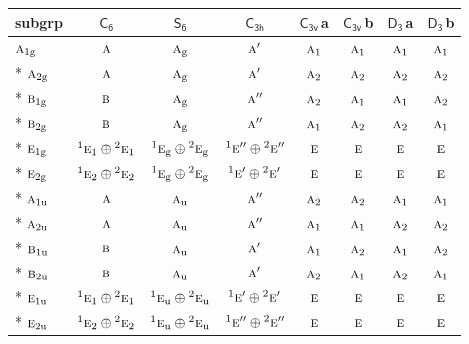 \documentclass[10pt,a4paper]{article}
\numberwithin{equation}{section}
\newcommand{\grp}[1]{\mathsf{#1}}
\newcommand{\irr}[1]{\text{\normalfont\scshape #1}}
\newcommand{\conjpair}[1]{{}^{#1}}
\newcommand{\ptag}[1]{\mathrm{#1}}
\newcommand{\clsletter}[1]{\,{\scriptsize\color{black!55}#1}}
\begin{document}
{\small\begin{longtable}{@{}lccccccc@{}}\toprule
subgrp & \href{C6.pdf}{$\grp{C_{6}}$} & \href{S6.pdf}{$\grp{S_{6}}$} & \href{C3h.pdf}{$\grp{C_{3h}}$} & \href{C3v.pdf}{$\grp{C_{3v}}$}\clsletter{a} & \href{C3v.pdf}{$\grp{C_{3v}}$}\clsletter{b} & \href{D3.pdf}{$\grp{D_{3}}$}\clsletter{a} & \href{D3.pdf}{$\grp{D_{3}}$}\clsletter{b}\\\midrule\endhead
\bottomrule\endfoot\endlastfoot
$\irr{a}_{1\ptag{g}}$ & $\irr{a}$ & $\irr{a}_{\ptag{g}}$ & $\irr{a}'$ & $\irr{a}_{1}$ & $\irr{a}_{1}$ & $\irr{a}_{1}$ & $\irr{a}_{1}$\\*
$\irr{a}_{2\ptag{g}}$ & $\irr{a}$ & $\irr{a}_{\ptag{g}}$ & $\irr{a}'$ & $\irr{a}_{2}$ & $\irr{a}_{2}$ & $\irr{a}_{2}$ & $\irr{a}_{2}$\\*
$\irr{b}_{1\ptag{g}}$ & $\irr{b}$ & $\irr{a}_{\ptag{g}}$ & $\irr{a}''$ & $\irr{a}_{2}$ & $\irr{a}_{1}$ & $\irr{a}_{1}$ & $\irr{a}_{2}$\\*
$\irr{b}_{2\ptag{g}}$ & $\irr{b}$ & $\irr{a}_{\ptag{g}}$ & $\irr{a}''$ & $\irr{a}_{1}$ & $\irr{a}_{2}$ & $\irr{a}_{2}$ & $\irr{a}_{1}$\\*
$\irr{e}_{1\ptag{g}}$ & $\conjpair{1}\irr{e}_{1}\oplus \conjpair{2}\irr{e}_{1}$ & $\conjpair{1}\irr{e}_{\ptag{g}}\oplus \conjpair{2}\irr{e}_{\ptag{g}}$ & $\conjpair{1}\irr{e}''\oplus \conjpair{2}\irr{e}''$ & $\irr{e}$ & $\irr{e}$ & $\irr{e}$ & $\irr{e}$\\*
$\irr{e}_{2\ptag{g}}$ & $\conjpair{1}\irr{e}_{2}\oplus \conjpair{2}\irr{e}_{2}$ & $\conjpair{1}\irr{e}_{\ptag{g}}\oplus \conjpair{2}\irr{e}_{\ptag{g}}$ & $\conjpair{1}\irr{e}'\oplus \conjpair{2}\irr{e}'$ & $\irr{e}$ & $\irr{e}$ & $\irr{e}$ & $\irr{e}$\\*
$\irr{a}_{1\ptag{u}}$ & $\irr{a}$ & $\irr{a}_{\ptag{u}}$ & $\irr{a}''$ & $\irr{a}_{2}$ & $\irr{a}_{2}$ & $\irr{a}_{1}$ & $\irr{a}_{1}$\\*
$\irr{a}_{2\ptag{u}}$ & $\irr{a}$ & $\irr{a}_{\ptag{u}}$ & $\irr{a}''$ & $\irr{a}_{1}$ & $\irr{a}_{1}$ & $\irr{a}_{2}$ & $\irr{a}_{2}$\\*
$\irr{b}_{1\ptag{u}}$ & $\irr{b}$ & $\irr{a}_{\ptag{u}}$ & $\irr{a}'$ & $\irr{a}_{1}$ & $\irr{a}_{2}$ & $\irr{a}_{1}$ & $\irr{a}_{2}$\\*
$\irr{b}_{2\ptag{u}}$ & $\irr{b}$ & $\irr{a}_{\ptag{u}}$ & $\irr{a}'$ & $\irr{a}_{2}$ & $\irr{a}_{1}$ & $\irr{a}_{2}$ & $\irr{a}_{1}$\\*
$\irr{e}_{1\ptag{u}}$ & $\conjpair{1}\irr{e}_{1}\oplus \conjpair{2}\irr{e}_{1}$ & $\conjpair{1}\irr{e}_{\ptag{u}}\oplus \conjpair{2}\irr{e}_{\ptag{u}}$ & $\conjpair{1}\irr{e}'\oplus \conjpair{2}\irr{e}'$ & $\irr{e}$ & $\irr{e}$ & $\irr{e}$ & $\irr{e}$\\*
$\irr{e}_{2\ptag{u}}$ & $\conjpair{1}\irr{e}_{2}\oplus \conjpair{2}\irr{e}_{2}$ & $\conjpair{1}\irr{e}_{\ptag{u}}\oplus \conjpair{2}\irr{e}_{\ptag{u}}$ & $\conjpair{1}\irr{e}''\oplus \conjpair{2}\irr{e}''$ & $\irr{e}$ & $\irr{e}$ & $\irr{e}$ & $\irr{e}$\\
\bottomrule\end{longtable}}
\end{document}
